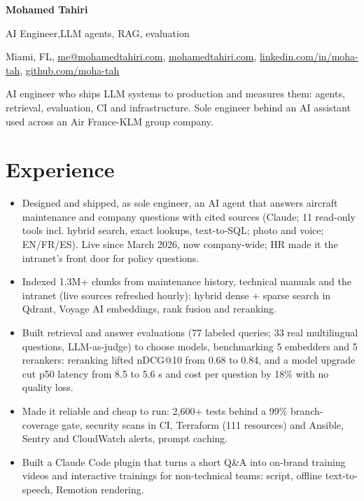 \documentclass[letterpaper,10pt]{article}
\begin{document}

{\color{accent}\fontsize{22}{24}\selectfont\bfseries Mohamed Tahiri}\par
\vspace{3pt}
{\large AI Engineer\sep LLM agents, RAG, evaluation}\par
\vspace{3pt}
{\small Miami, FL\sep
\href{mailto:me@mohamedtahiri.com}{me@mohamedtahiri.com}\sep
\href{https://mohamedtahiri.com}{mohamedtahiri.com}\sep
\href{https://linkedin.com/in/moha-tah}{linkedin.com/in/moha-tah}\sep
\href{https://github.com/moha-tah}{github.com/moha-tah}}\par
\vspace{5pt}
AI engineer who ships LLM systems to production and measures them: agents, retrieval, evaluation, CI and
infrastructure. Sole engineer behind an AI assistant used across an Air France-KLM group company.

\section{Experience}

\begin{itemize}
  \item Designed and shipped, as sole engineer, an AI agent that answers aircraft maintenance and company questions
        with cited sources (Claude; 11 read-only tools incl. hybrid search, exact lookups, text-to-SQL; photo and voice;
        EN/FR/ES). Live since March 2026, now company-wide; HR made it the intranet's front door for policy
        questions.
  \item Indexed 1.3M+ chunks from maintenance history, technical manuals and the intranet (live sources refreshed
        hourly): hybrid dense + sparse search in Qdrant, Voyage AI embeddings, rank fusion and reranking.
  \item Built retrieval and answer evaluations (77 labeled queries; 33 real multilingual questions, LLM-as-judge) to
        choose models, benchmarking 5 embedders and 5 rerankers: reranking lifted nDCG@10 from 0.68 to 0.84, and a model
        upgrade cut p50 latency from 8.5 to 5.6 s and cost per question by 18\% with no quality loss.
  \item Made it reliable and cheap to run: 2,600+ tests behind a 99\% branch-coverage gate, security scans in CI,
        Terraform (111 resources) and Ansible, Sentry and CloudWatch alerts, prompt caching.
  \item Built a Claude Code plugin that turns a short Q\&A into on-brand training videos and interactive trainings
        for non-technical teams: script, offline text-to-speech, Remotion rendering.
\end{itemize}
\entrygap
\end{document}
